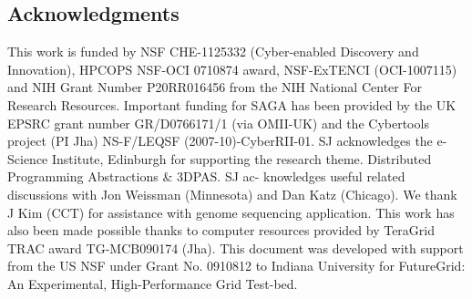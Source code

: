\documentclass{acm_proc_article-sp}
\begin{document}
\subsection*{Acknowledgments}
\scriptsize This work is funded by NSF CHE-1125332 (Cyber-enabled
Discovery and Innovation), HPCOPS NSF-OCI 0710874 award, NSF-ExTENCI
(OCI-1007115) and NIH Grant Number P20RR016456 from the NIH National
Center For Research Resources. Important funding for SAGA has been
provided by the UK EPSRC grant number GR/D0766171/1 (via OMII-UK) and
the Cybertools project (PI Jha) NS-F/LEQSF (2007-10)-CyberRII-01. SJ
acknowledges the e-Science Institute, Edinburgh for supporting the
research theme. Distributed Programming Abstractions \& 3DPAS. SJ ac-
knowledges useful related discussions with Jon Weissman (Minnesota)
and Dan Katz (Chicago). We thank J Kim (CCT) for assistance with
genome sequencing application. This work has also been made possible
thanks to computer resources provided by TeraGrid TRAC award
TG-MCB090174 (Jha). This document was developed with support from the
US NSF under Grant No. 0910812 to Indiana University for FutureGrid:
An Experimental, High-Performance Grid Test-bed.
\end{document}
